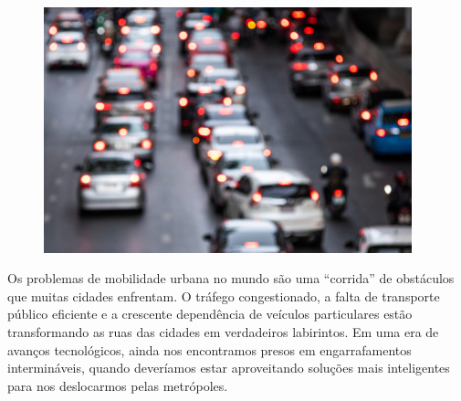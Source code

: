 \begin{myquote}





\begin{figure}[H]
\centering
\includegraphics[width=0.95\textwidth]{./imgSAEB_7_POR/media/image75.png}
\end{figure} 

Os problemas de mobilidade urbana no mundo são uma ``corrida'' de obstáculos que
muitas cidades enfrentam. O tráfego congestionado, a falta de
transporte público eficiente e a crescente dependência de veículos
particulares estão transformando as ruas das cidades em verdadeiros
labirintos. Em uma era de avanços tecnológicos, ainda nos encontramos presos
em engarrafamentos intermináveis, quando deveríamos estar aproveitando
soluções mais inteligentes para nos deslocarmos pelas metrópoles.



\end{myquote}

